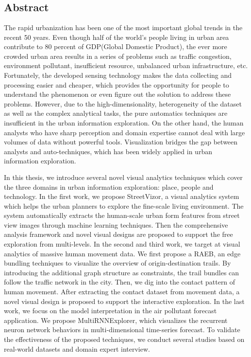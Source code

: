 \chapter{}
\section{Abstract}
The rapid urbanization has been one of the most important global trends in the recent 50 years. Even though half of the world's people living in urban area contribute to 80 percent of GDP(Global Domestic Product), the ever more crowded urban area results in a series of problems such as traffic congestion, environment pollutant, insufficient resource, unbalanced urban infrastructure, etc. Fortunately, the developed sensing technology makes the data collecting and processing easier and cheaper, which provides the opportunity for people to understand the phenomenon or even figure out the solution to address these problems. However, due to the high-dimensionality, heterogeneity of the dataset as well as the complex analytical tasks, the pure automatics techniques are insufficient in the urban information exploration. On the other hand, the human analysts who have sharp perception and domain expertise cannot deal with large volumes of data without powerful tools. Visualization bridges the gap between analysts and auto-techniques, which has been widely applied in urban information exploration. 

In this thesis, we introduce several novel visual analytics techniques which cover the three domains in urban information exploration: place, people and technology.
In the first work, we propose StreetVizor, a visual analytics system which helps the urban planners to explore the fine-scale living environment. The system automatically extracts the human-scale urban form features from street view images through machine learning techniques. Then the comprehensive analysis framework and novel visual designs are proposed to support the free exploration from multi-levels. 
In the second and third work, we target at visual analytics of massive human movement data. We first propose a RAEB, an edge bundling techniques to visualize the overview of origin-destination trails. By introducing the additional graph structure as constraints, the trail bundles can follow the traffic network in the city. Then, we dig into the contact pattern of human movement. After extracting the contact dataset from movement data, a novel visual design is proposed to support the interactive exploration. 
In the last work, we focus on the model interpretation in the air pollutant forecast application. We propose MultiRNNExplorer, which visualizes the recurrent neuron network behaviors in multi-dimensional time-series forecast. 
To validate the effectiveness of the proposed techniques, we conduct several studies based on real-world datasets and domain expert interview.  


